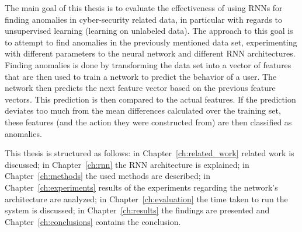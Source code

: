 The main goal of this thesis is to evaluate the effectiveness of using RNNs for finding anomalies in cyber-security related data, in particular with regards to unsupervised learning (learning on unlabeled data). The approach to this goal is to attempt to find anomalies in the previously mentioned data set, experimenting with different parameters to the neural network and different RNN architectures. Finding anomalies is done by transforming the data set into a vector of features that are then used to train a network to predict the behavior of a user. The network then predicts the next feature vector based on the previous feature vectors. This prediction is then compared to the actual features. If the prediction deviates too much from the mean differences calculated over the training set, these features (and the action they were constructed from) are then classified as anomalies.

This thesis is structured as follows: in Chapter~\ref{ch:related_work} related work is discussed; in Chapter~\ref{ch:rnn} the RNN architecture is explained; in Chapter~\ref{ch:methods} the used methods are described; in Chapter~\ref{ch:experiments} results of the experiments regarding the network's architecture are analyzed; in Chapter~\ref{ch:evaluation} the time taken to run the system is discussed; in Chapter~\ref{ch:results} the findings are presented and Chapter~\ref{ch:conclusions} contains the conclusion.